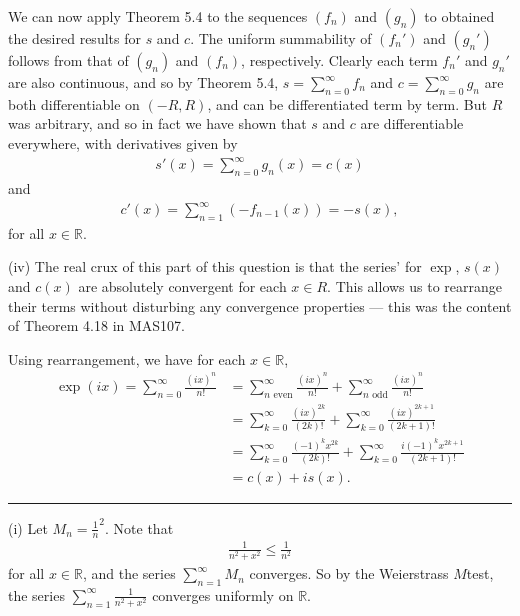 \documentclass[letterpaper,10pt,english]{jupyterBook}
\begin{document}
We can now apply Theorem 5.4 to the sequences \((f_n)\) and \((g_n)\) to obtained the desired results for \(s\) and \(c\). The uniform summability of \((f_n')\) and \((g_n')\) follows from that of \((g_n)\) and \((f_n)\), respectively. Clearly each term \(f_n'\) and \(g_n'\) are also continuous, and so by Theorem 5.4, \(s=\sum_{n=0}^\infty f_n\) and \(c=\sum_{n=0}^\infty g_n\) are both differentiable on \((-R,R)\), and can be differentiated term by term. But \(R\) was arbitrary, and so in fact we have shown that \(s\) and \(c\) are differentiable everywhere, with derivatives given by
\begin{equation*}
\begin{split}
s'(x) = \sum_{n=0}^\infty g_n(x) = c(x)
\end{split}
\end{equation*}
\sphinxAtStartPar
and
\begin{equation*}
\begin{split}
c'(x) = \sum_{n=1}^\infty (-f_{n-1}(x)) = -s(x),
\end{split}
\end{equation*}
\sphinxAtStartPar
for all \(x\in\mathbb{R}\).

\sphinxAtStartPar
(iv) The real crux of this part of this question is that the series’ for \(\exp\), \(s(x)\) and \(c(x)\) are absolutely convergent for each \(x\in R\). This allows us to rearrange their terms without disturbing any convergence properties — this was the content of Theorem 4.18 in MAS107.

\sphinxAtStartPar
Using rearrangement, we have for each \(x\in\mathbb{R}\),
\begin{align*}
\exp(ix) = \sum_{n=0}^\infty\frac{(ix)^n}{n!} &= \sum_{n \text{ even}}^\infty\frac{(ix)^n}{n!}  + \sum_{n \text{ odd}}^\infty\frac{(ix)^n}{n!} \\
&= \sum_{k=0}^\infty\frac{(ix)^{2k}}{(2k)!} + \sum_{k=0}^\infty\frac{(ix)^{2k+1}}{(2k+1)!} \\
&= \sum_{k=0}^\infty\frac{(-1)^kx^{2k}}{(2k)!} + \sum_{k=0}^\infty\frac{i(-1)^kx^{2k+1}}{(2k+1)!} \\
&= c(x) + is(x).
\end{align*}

\bigskip\hrule\bigskip


\sphinxAtStartPar
{\hyperref[\detokenize{Problems:id62}]{}}
(i) Let \(M_n =\frac{1}{n}^2\). Note that
\begin{equation*}
\begin{split}
\frac{1}{n^2+x^2} \leq \frac{1}{n^2}
\end{split}
\end{equation*}
\sphinxAtStartPar
for all \(x\in \mathbb{R}\), and the series \(\sum_{n=1}^\infty M_n\) converges. So by the Weierstrass \(M\)\sphinxhyphen{}test, the series \( \sum_{n=1}^\infty \frac{1}{n^2 +x^2}\) converges uniformly on \(\mathbb{R}\).
\end{document}

